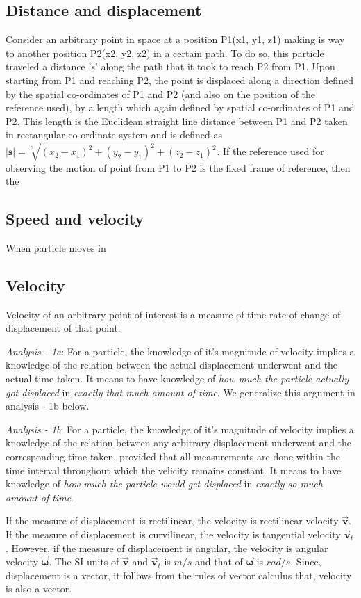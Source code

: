 \subsection{Distance and displacement}
Consider an arbitrary point in space at a position P1(x1, y1, z1) making is way to another position P2(x2, y2, z2) in a certain path. To do so, this particle traveled a distance 's' along the path that it took to reach P2 from P1. Upon starting from P1 and reaching P2, the point is displaced along a direction defined by the spatial co-ordinates of P1 and P2 (and also on the position of the reference used), by a length which again defined by spatial co-ordinates of P1 and P2. This length is the Euclidean straight line distance between P1 and P2 taken in rectangular co-ordinate system and is defined as $|\mathbf{s}| = \sqrt[2]{(x_2-x_1)^2+(y_2-y_1)^2+(z_2-z_1)^2}$. If the reference used for observing the motion of point from P1 to P2 is the fixed frame of reference, then the 

\subsection{Speed and velocity} When particle moves in 

\subsection{Velocity}
Velocity  of an arbitrary point of interest is a measure of time rate of change of displacement of that point. 

\textit{Analysis - 1a}: For a particle, the knowledge of it's magnitude of velocity implies a  knowledge of the relation between the actual displacement underwent and the actual time taken. It means to have knowledge of \textit{how much the particle actually got displaced} in \textit{exactly that much amount of time}. We generalize this argument in analysis - 1b below.

\textit{Analysis - 1b}: For a particle, the knowledge of it's magnitude of velocity implies a  knowledge of the relation between any arbitrary displacement underwent and the corresponding time taken, provided that all measurements are done within the time interval throughout which the velicity remains constant. It means to have knowledge of \textit{how much the particle would get displaced} in \textit{exactly so much amount of time}.

If the measure of displacement is rectilinear, the velocity is rectilinear velocity $\vec{\mathbf{v}}$. If the measure of displacement is curvilinear, the velocity is tangential velocity $\vec{\mathbf{v}}_t$. However, if the measure of displacement is angular, the velocity is angular velocity $\vec{\mathbf{\omega}}$. The SI units of $\vec{\mathbf{v}}$ and $\vec{\mathbf{v}}_t$ is $m/s$ and that of $\vec{\mathbf{\omega}}$ is $rad/s$. Since, displacement is a vector, it follows from the rules of vector calculus that, velocity is also a vector.

